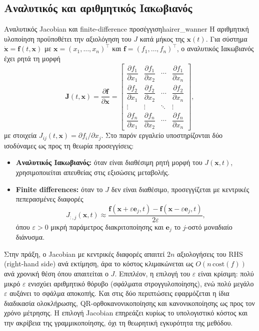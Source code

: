 \documentclass[11pt,a4paper]{report}
\begin{document}
\subsection{Αναλυτικός και αριθμητικός Ιακωβιανός}
\label{subsec:jacobian-analytic-fd}
\begin{definitionbox}{Αναλυτικός Jacobian και finite-difference προσέγγιση}{hairer_wanner}
Η αριθμητική υλοποίηση προϋποθέτει την αξιολόγηση του $J$ κατά μήκος της $\mathbf{x}(t)$.
Για σύστημα $\dot{\mathbf{x}}=\mathbf{f}(t,\mathbf{x})$ με $\mathbf{x}=(x_1,\dots,x_n)^\top$
και $\mathbf{f}=(f_1,\dots,f_n)^\top$, ο αναλυτικός Ιακωβιανός έχει ρητά τη μορφή
\begin{equation}
\mathbf{J}(t,\mathbf{x})=\frac{\partial \mathbf{f}}{\partial \mathbf{x}}=
\begin{bmatrix}
\dfrac{\partial f_1}{\partial x_1} & \dfrac{\partial f_1}{\partial x_2} & \cdots & \dfrac{\partial f_1}{\partial x_n} \\
\dfrac{\partial f_2}{\partial x_1} & \dfrac{\partial f_2}{\partial x_2} & \cdots & \dfrac{\partial f_2}{\partial x_n} \\
\vdots & \vdots & \ddots & \vdots \\
\dfrac{\partial f_n}{\partial x_1} & \dfrac{\partial f_n}{\partial x_2} & \cdots & \dfrac{\partial f_n}{\partial x_n}
\end{bmatrix},
\end{equation}
με στοιχεία $J_{ij}(t,\mathbf{x})=\partial f_i/\partial x_j$.
Στο παρόν εργαλείο υποστηρίζονται δύο ισοδύναμες ως προς τη θεωρία προσεγγίσεις:
\begin{itemize}
\item \textbf{Αναλυτικός Ιακωβιανός:} όταν είναι διαθέσιμη ρητή μορφή του $J(\mathbf{x},t)$, χρησιμοποιείται απευθείας στις εξισώσεις μεταβολής.
\item \textbf{Finite differences:} όταν το $J$ δεν είναι διαθέσιμο, προσεγγίζεται με κεντρικές πεπερασμένες διαφορές
\begin{equation}
J_{:,j}(\mathbf{x},t)\approx
\frac{\mathbf{f}(\mathbf{x}+\varepsilon \mathbf{e}_j,t)-\mathbf{f}(\mathbf{x}-\varepsilon \mathbf{e}_j,t)}{2\varepsilon},
\end{equation}
όπου $\varepsilon>0$ μικρή παράμετρος διακριτοποίησης και $\mathbf{e}_j$ το $j$-οστό μοναδιαίο διάνυσμα.
\end{itemize}
\end{definitionbox}
Στην πράξη, ο Jacobian με κεντρικές διαφορές απαιτεί $2n$ αξιολογήσεις του RHS (right-hand side) ανά εκτίμηση,
άρα το κόστος κλιμακώνεται ως $O(n\,\mathrm{cost}(f))$ ανά χρονική θέση όπου απαιτείται ο $J$.
Επιπλέον, η επιλογή του $\varepsilon$ είναι κρίσιμη: πολύ μικρό $\varepsilon$ ενισχύει αριθμητικό θόρυβο
(σφάλματα στρογγυλοποίησης), ενώ πολύ μεγάλο $\varepsilon$ αυξάνει το σφάλμα αποκοπής.
Και στις δύο περιπτώσεις εφαρμόζεται η ίδια διαδικασία ολοκλήρωσης, QR-ορθοκανονικοποίησης και κανονικοποίησης ως προς τον χρόνο μέτρησης.
Η επιλογή Jacobian επηρεάζει κυρίως το υπολογιστικό κόστος και την ακρίβεια της γραμμικοποίησης, όχι τη θεωρητική εγκυρότητα της μεθόδου.
\end{document}
